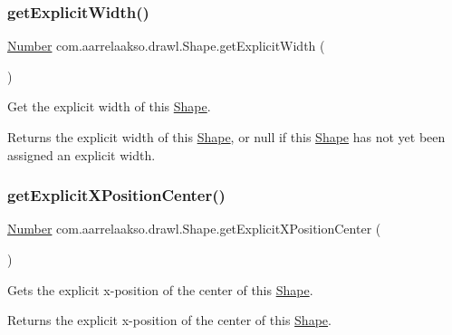 \subsubsection{\texorpdfstring{get\+Explicit\+Width()}{getExplicitWidth()}}
{\footnotesize\ttfamily \hyperlink{interfacecom_1_1aarrelaakso_1_1drawl_1_1_number}{Number} com.\+aarrelaakso.\+drawl.\+Shape.\+get\+Explicit\+Width (\begin{DoxyParamCaption}{ }\end{DoxyParamCaption})\hspace{0.3cm}{\ttfamily [protected]}}



Get the explicit width of this \hyperlink{classcom_1_1aarrelaakso_1_1drawl_1_1_shape}{Shape}. 

\begin{DoxyReturn}{Returns}
the explicit width of this \hyperlink{classcom_1_1aarrelaakso_1_1drawl_1_1_shape}{Shape}, or {\ttfamily null} if this \hyperlink{classcom_1_1aarrelaakso_1_1drawl_1_1_shape}{Shape} has not yet been assigned an explicit width. 
\end{DoxyReturn}
\mbox{\label{classcom_1_1aarrelaakso_1_1drawl_1_1_shape_aa1fbd5a290bc5d2df437f0bd79f30a89}} 
\subsubsection{\texorpdfstring{get\+Explicit\+X\+Position\+Center()}{getExplicitXPositionCenter()}}
{\footnotesize\ttfamily \hyperlink{interfacecom_1_1aarrelaakso_1_1drawl_1_1_number}{Number} com.\+aarrelaakso.\+drawl.\+Shape.\+get\+Explicit\+X\+Position\+Center (\begin{DoxyParamCaption}{ }\end{DoxyParamCaption})\hspace{0.3cm}{\ttfamily [protected]}}



Gets the explicit x-\/position of the center of this \hyperlink{classcom_1_1aarrelaakso_1_1drawl_1_1_shape}{Shape}. 

\begin{DoxyReturn}{Returns}
the explicit x-\/position of the center of this \hyperlink{classcom_1_1aarrelaakso_1_1drawl_1_1_shape}{Shape}. 
\end{DoxyReturn}
\mbox{\label{classcom_1_1aarrelaakso_1_1drawl_1_1_shape_abd7f6c77e2c62100bb72d8ad3085e288}} 
